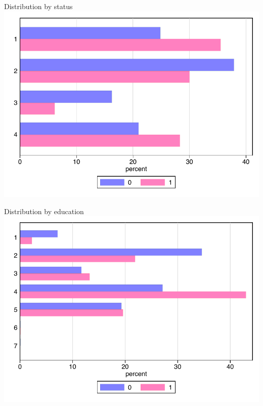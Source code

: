 \documentclass{beamer}
\begin{document}
\begin{frame}{Distribution by status}
    \includegraphics[scale = 0.7]{images/status.pdf}
\end{frame}

\begin{frame}{Distribution by education}
    \includegraphics[scale = 0.7]{images/obrzw.pdf}
\end{frame}
\end{document}
